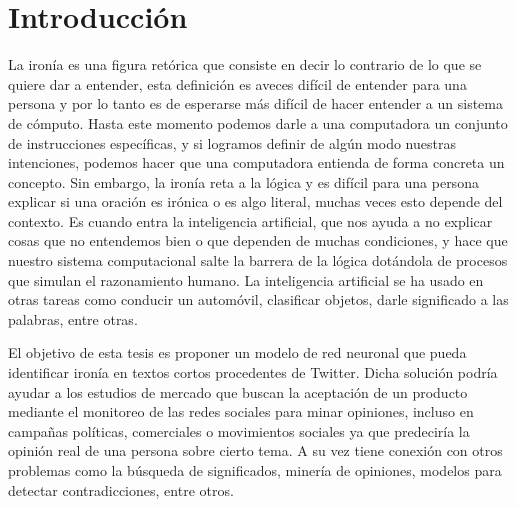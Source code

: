 
  	\chapter{Introducción}\label{cap.introduccion}
		\onehalfspacing
  		
			\par La ironía es una figura retórica que consiste en decir lo contrario de lo que se quiere dar a entender, esta definición es aveces difícil de entender para una persona y por lo tanto es de esperarse más difícil de hacer entender a un sistema de cómputo. Hasta este momento podemos darle a una computadora un conjunto de instrucciones específicas, y si logramos definir de algún modo nuestras intenciones, podemos hacer que una computadora entienda de forma concreta un concepto. Sin embargo, la ironía reta a la lógica y es difícil para una persona explicar si una oración es irónica o es algo literal, muchas veces esto depende del contexto. Es cuando entra la inteligencia artificial, que nos ayuda a no explicar cosas que no entendemos bien o que dependen de muchas condiciones, y hace que nuestro sistema computacional salte la barrera de la lógica dotándola de procesos que simulan el razonamiento humano. La inteligencia artificial se ha usado en otras tareas como conducir un automóvil, clasificar objetos, darle significado a las palabras, entre otras.
			
  			\par El objetivo de esta tesis es proponer un modelo de red neuronal que pueda identificar ironía en textos cortos procedentes de Twitter. Dicha solución podría ayudar a los estudios de mercado que buscan la aceptación de un producto mediante el monitoreo de las redes sociales para minar opiniones, incluso en campañas políticas, comerciales o movimientos sociales ya que predeciría la opinión real de una persona sobre cierto tema. A su vez tiene conexión con otros problemas como la búsqueda de significados, minería de opiniones, modelos para detectar contradicciones, entre otros.
            
 
		
